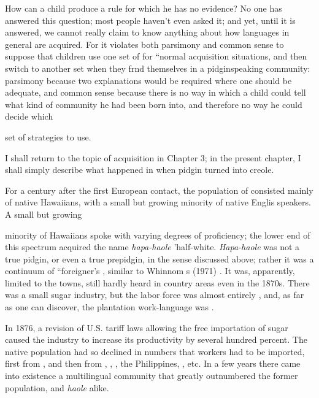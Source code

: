 How can a child produce a rule for which he has no evidence? No one has answered this question; most people haven't even asked it; and yet, until it is answered, we cannot really claim to know any\-thing about how languages in general are acquired. For it violates both parsimony and common sense to suppose that children use one set of  for ``normal acquisition situations, and then switch to another set when they frnd themselves in a pidgin\-speaking community: parsimony because two explanations would be required where one should be adequate, and common sense because there is no way in which a child could tell what kind of community he had been born into, and therefore no way he could decide which

set of strategies to use.

I shall return to the topic of acquisition in Chapter 3; in the present chapter, I shall simply describe what happened in  when pidgin turned into creole.

For a century after the first European contact, the population of  consisted mainly of native Hawaiians, with a small but growing minority of native Englis speakers. A small but growing

minority of Hawaiians spoke  with varying degrees of profi\-ciency; the lower end of this spectrum acquired the name \textit{hapa-haole} 'half-white. \textit{Hapa-haole} was not a true pidgin, or even a true pre\-pidgin, in the sense discussed above; rather it was a continuum of ``foreigner's , similar to Whinnom s (1971)  \textit{.} It was, apparently, limited to the towns, still hardly heard in country areas even in the 1870s. There was a small sugar industry, but the labor force was almost entirely , and, as far as one can discover, the plantation work-language was .

In 1876, a revision of U.S. tariff laws allowing the free importa\-tion of  sugar caused the industry to increase its productivity by several hundred percent. The native  population had so declined in numbers that workers had to be imported, first from , and then from , , , the Philippines, , etc. In a few years there came into existence a multilingual community that greatly outnumbered the former population,  and \textit{haole} alike.

